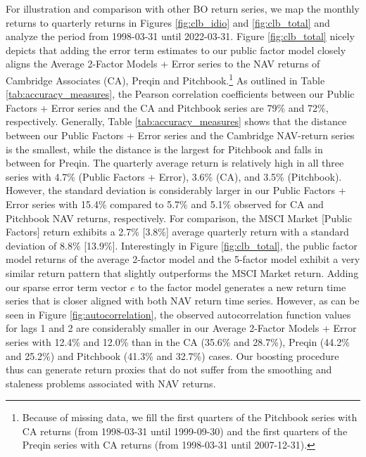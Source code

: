 \documentclass[12pt]{article}
\begin{document}
For illustration and comparison with other BO return series, we map the monthly returns to quarterly returns in Figures \ref{fig:clb_idio} and \ref{fig:clb_total} and analyze the period from 1998-03-31 until 2022-03-31.
Figure \ref{fig:clb_total} nicely depicts that adding the error term estimates to our public factor model closely aligns the Average 2-Factor Models + Error series to the NAV returns of Cambridge Associates (CA), Preqin and Pitchbook.\footnote{Because of missing data, we fill the first quarters of the Pitchbook series with CA returns (from 1998-03-31 until 1999-09-30) and the first quarters of the Preqin series with CA returns (from 1998-03-31 until 2007-12-31).
}
As outlined in Table \ref{tab:accuracy_measures}, the Pearson correlation coefficients between our Public Factors + Error series and the CA and Pitchbook series are 79\% and 72\%, respectively.
Generally, Table \ref{tab:accuracy_measures} shows that the distance between our Public Factors + Error series and the Cambridge NAV-return series is the smallest, while the distance is the largest for Pitchbook and falls in between for Preqin.
The quarterly average return is relatively high in all three series with 4.7\% (Public Factors + Error), 3.6\% (CA), and 3.5\% (Pitchbook).
However, the standard deviation is considerably larger in our Public Factors + Error series with 15.4\% compared to 5.7\% and 5.1\% observed for CA and Pitchbook NAV returns, respectively.
For comparison, the MSCI Market [Public Factors] return exhibits a 2.7\% [3.8\%] average quarterly return with a standard deviation of 8.8\% [13.9\%].
Interestingly in Figure \ref{fig:clb_total}, the public factor model returns of the average 2-factor model and the 5-factor model exhibit a very similar return pattern that slightly outperforms the MSCI Market return.
Adding our sparse error term vector $e$ to the factor model generates a new return time series that is closer aligned with both NAV return time series.
However, as can be seen in Figure \ref{fig:autocorrelation}, the observed autocorrelation function values for lags 1 and 2 are considerably smaller in our Average 2-Factor Models + Error series with 12.4\% and 12.0\% than in the CA (35.6\% and 28.7\%), Preqin (44.2\% and 25.2\%) and Pitchbook (41.3\% and 32.7\%) cases.
Our boosting procedure thus can generate return proxies that do not suffer from the smoothing and staleness problems associated with NAV returns.
\end{document}
